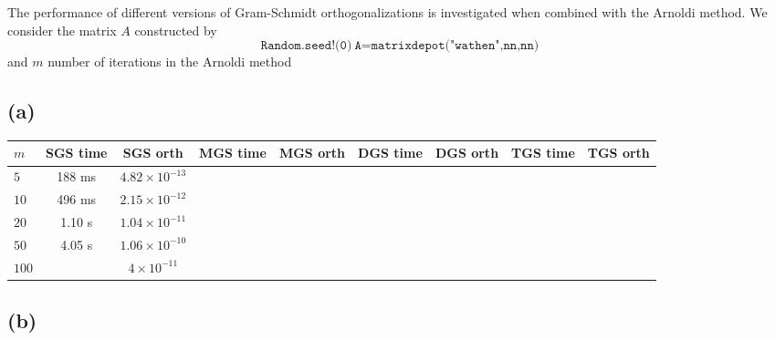 The performance of different versions of Gram-Schmidt orthogonalizations is investigated when combined with the Arnoldi method. We consider the matrix $A$ constructed by
\begin{equation}
\texttt{Random.seed!(0)}\medspace\texttt{A=matrixdepot("wathen",nn,nn)}
\end{equation}
and $m$ number of iterations in the Arnoldi method
\subsection{(a)}
\begin{table}[h]
\centering

\begin{tabular}{l | c | c|| c | c || c | c|| c | c}
$m$& SGS time & SGS orth & MGS time & MGS orth & DGS time & DGS orth & TGS time & TGS orth \\ \hline 
$5$ & 188 ms& $4.82\times 10^{-13}$& & & & & & \\
$10$ & 496 ms& $2.15\times 10^{-12}$ & & & & & & \\
$20$ & 1.10 s& $1.04\times 10^{-11}$& & & & & & \\
$50$ & 4.05 s&$1.06\times 10^{-10}$ & & & & & & \\
$100$ & &$4\times 10^{-11}$  & & & & & & \\
\end{tabular}

\end{table}

\subsection{(b)}


